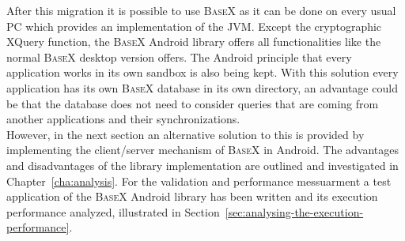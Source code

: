 After this migration it is possible to use \textsc{BaseX} as it can be done on every usual PC which provides an implementation of the JVM.
Except the cryptographic XQuery function, the \textsc{BaseX} Android library offers all functionalities like the normal \textsc{BaseX} desktop version offers.
The Android principle that every application works in its own sandbox is also being kept.
With this solution every application has its own \textsc{BaseX} database in its own directory, an advantage could be that the database does not need to consider queries that are coming from another applications and their synchronizations.\\
However, in the next section an alternative solution to this is provided by implementing the client/server mechanism of \textsc{BaseX} in Android.
The advantages and disadvantages of the library implementation are outlined and investigated in Chapter~\ref{cha:analysis}.
For the validation and performance messuarment a test application of the \textsc{BaseX} Android library has been written and its execution performance analyzed, illustrated in Section~\ref{sec:analysing-the-execution-performance}.

